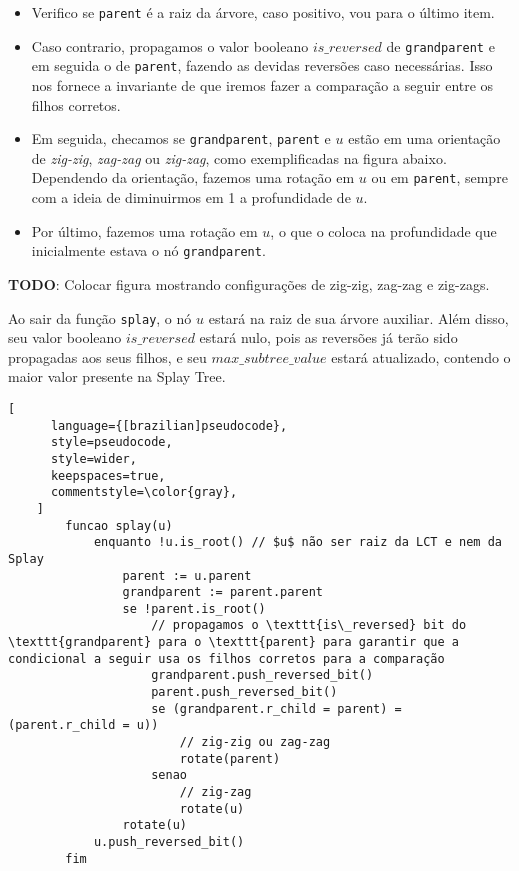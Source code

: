 \begin{itemize}
    \item Verifico se \texttt{parent} é a raiz da árvore, caso positivo, vou para o último item.
    \item Caso contrario, propagamos o valor booleano $is\_reversed$ de \texttt{grandparent} e em seguida o de \texttt{parent}, fazendo as devidas reversões caso necessárias. Isso nos fornece a invariante de que iremos fazer a comparação a seguir entre os filhos corretos.
    \item Em seguida, checamos se \texttt{grandparent}, \texttt{parent} e $u$ estão em uma orientação de \textit{zig-zig}, \textit{zag-zag} ou \textit{zig-zag}, como exemplificadas na figura abaixo. Dependendo da orientação, fazemos uma rotação em $u$ ou em \texttt{parent}, sempre com a ideia de diminuirmos em 1 a profundidade de $u$.
    \item Por último, fazemos uma rotação em $u$, o que o coloca na profundidade que inicialmente estava o nó \texttt{grandparent}.
\end{itemize}

\begin{center}
    \textbf{TODO}: Colocar figura mostrando configurações de zig-zig, zag-zag e zig-zags.
\end{center}

Ao sair da função \texttt{splay}, o nó $u$ estará na raiz de sua árvore auxiliar. Além disso, seu valor booleano $is\_reversed$ estará nulo, pois as reversões já terão sido propagadas aos seus filhos, e seu $max\_subtree\_value$ estará atualizado, contendo o maior valor presente na Splay Tree.

\begin{programruledcaption}{\label{splay:splay}}
    \begin{lstlisting}[
      language={[brazilian]pseudocode},
      style=pseudocode,
      style=wider,
      keepspaces=true,
      commentstyle=\color{gray},
    ]
        funcao splay(u)
            enquanto !u.is_root() // $u$ não ser raiz da LCT e nem da Splay
                parent := u.parent
                grandparent := parent.parent
                se !parent.is_root()
                    // propagamos o \texttt{is\_reversed} bit do \texttt{grandparent} para o \texttt{parent} para garantir que a condicional a seguir usa os filhos corretos para a comparação
                    grandparent.push_reversed_bit()
                    parent.push_reversed_bit()
                    se (grandparent.r_child = parent) = (parent.r_child = u))
                        // zig-zig ou zag-zag
                        rotate(parent)
                    senao
                        // zig-zag
                        rotate(u)
                rotate(u)
            u.push_reversed_bit()
        fim
    \end{lstlisting}
\end{programruledcaption}

